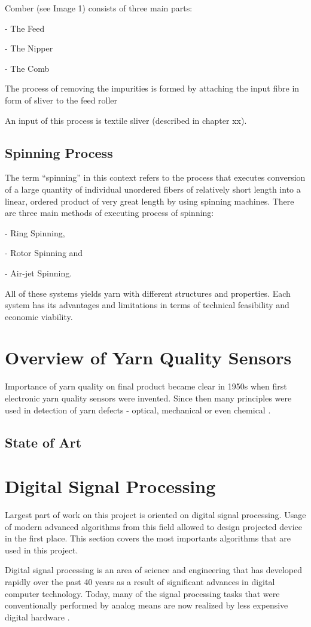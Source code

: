 \documentclass[twoside]{ctuthesis}
\theoremstyle{plain}
\theoremstyle{definition}
\theoremstyle{note}
\begin{document}
Comber (see Image 1) consists of three main parts: 

- The Feed

- The Nipper

- The Comb

The process of removing the impurities is formed by attaching the input fibre in form of sliver to the feed roller

An input of this process is textile sliver (described in chapter xx).
\subsection{Spinning Process}
The term “spinning” in this context refers to the process that executes conversion of a large quantity of individual unordered fibers of relatively short length into a linear, ordered product of very great length by using spinning machines. There are three main methods of executing process of spinning:

- Ring Spinning,

- Rotor Spinning and

- Air-jet Spinning.

All of these systems yields yarn with different structures and properties. Each system has its advantages and limitations in terms of technical feasibility and economic viability.
\section{Overview of Yarn Quality Sensors}
Importance of yarn quality on final product became clear in 1950s when first electronic yarn quality sensors were invented. Since then many principles were used in detection of yarn defects - optical, mechanical or even chemical \cite{cite:1} . 
\subsection{State of Art}

\section{Digital Signal Processing}
Largest part of work on this project is oriented on digital signal processing. Usage of modern advanced algorithms from this field allowed to design projected device in the first place. This section covers the most importants algorithms that are used in this project.
	
	Digital signal processing is an area of science and engineering that has developed rapidly over the past 40 years as a result of significant advances in digital computer technology. Today, many of the signal processing tasks that were conventionally performed by analog means are now realized by less expensive digital hardware \cite{cite:2}.
	
\end{document}
